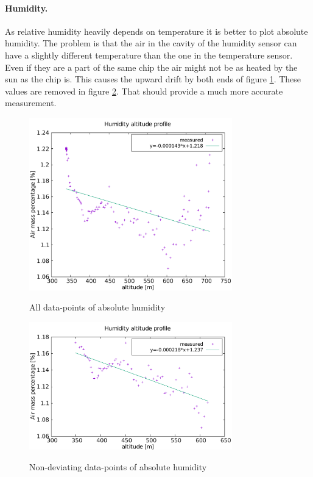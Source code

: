 \documentclass{cfp}
\begin{document}
\paragraph{Humidity.} As relative humidity heavily depends on temperature it is better to plot absolute humidity. The problem is that the air in the cavity of the humidity sensor can have a slightly different temperature than the one in the temperature sensor. Even if they are a part of the same chip the air might not be as heated by the sun as the chip is. This causes the upward drift by both ends of figure \ref{hum1}. These values are removed in figure \ref{hum2}. That should provide a much more accurate measurement.
\begin{figure}[!h]
\centering
\caption{All data-points of absolute humidity}
\includegraphics[width=250pt]{hum.pdf}
\label{hum1}
\end{figure}
\begin{figure}[!h]
\centering
\caption{Non-deviating data-points of absolute humidity}
\includegraphics[width=250pt]{hum2.pdf}
\label{hum2}
\end{figure}
\end{document}

